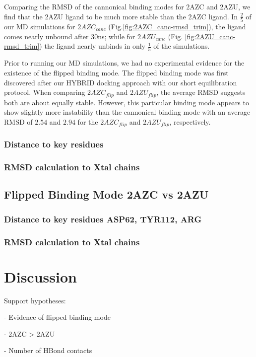\documentclass[fleqn,10pt]{wlscirep}
\begin{document}
Comparing the RMSD of the cannonical binding modes for 2AZC and 2AZU, we find that the 2AZU ligand to be much more stable than the 2AZC ligand.
In $\frac{2}{5}$ of our MD simulations for $2AZC_{canc}$ (Fig.\ref{fig:2AZC_canc-rmsd_trim}), the ligand comes nearly unbound after 30ns; while for $2AZU_{canc}$ (Fig. \ref{fig:2AZU_canc-rmsd_trim}) the ligand nearly unbinds in only $\frac{1}{5}$ of the simulations.

Prior to running our MD simulations, we had no experimental evidence for the existence of the flipped binding mode.
The flipped binding mode was first discovered after our HYBRID docking approach with our short equilibration protocol.
When comparing $2AZC_{flip}$ and $2AZU_{flip}$, the average RMSD suggests both are about equally stable.
However, this particular binding mode appears to show slightly more instability than the cannonical binding mode with an average RMSD of $2.54$ and $2.94$ for the $2AZC_{flip}$ and $2AZU_{flip}$, respectively.

\subsubsection{Distance to key residues}


\subsubsection*{RMSD calculation to Xtal chains}

\subsection*{Flipped Binding Mode 2AZC vs 2AZU}
\subsubsection*{Distance to key residues ASP62, TYR112, ARG}
\subsubsection*{RMSD calculation to Xtal chains}


\section*{Discussion}
Support hypotheses:

  - Evidence of flipped binding mode
  
  - 2AZC > 2AZU
  
     - Number of HBond contacts
     
\end{document}
